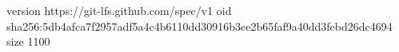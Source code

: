 version https://git-lfs.github.com/spec/v1
oid sha256:5db4afca7f2957adf5a4c4b6110dd30916b3ce2b65faf9a40dd3febd26dc4694
size 1100
